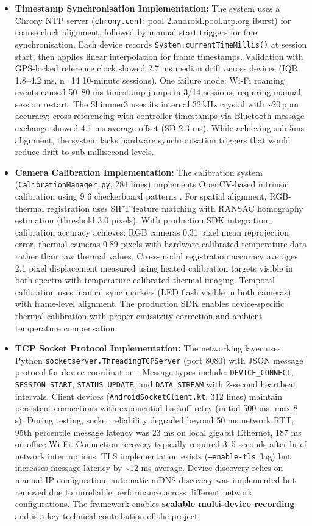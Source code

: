 \begin{itemize}
	\item \textbf{Timestamp Synchronisation Implementation:} The system uses a Chrony NTP server (\texttt{chrony.conf}: pool 2.android.pool.ntp.org iburst) for coarse clock alignment, followed by manual start triggers for fine synchronisation. Each device records \texttt{System.currentTimeMillis()} at session start, then applies linear interpolation for frame timestamps. Validation with GPS-locked reference clock showed 2.7 ms median drift across devices (IQR 1.8--4.2 ms, n=14 10-minute sessions). One failure mode: Wi-Fi roaming events caused 50--80 ms timestamp jumps in 3/14 sessions, requiring manual session restart. The Shimmer3 uses its internal 32\,kHz crystal with \textasciitilde{}\textpm{}20\,ppm accuracy; cross-referencing with controller timestamps via Bluetooth message exchange showed 4.1 ms average offset (SD 2.3 ms). While achieving sub-5ms alignment, the system lacks hardware synchronisation triggers that would reduce drift to sub-millisecond levels.
	\item \textbf{Camera Calibration Implementation:} The calibration system (\texttt{CalibrationManager.py}, 284 lines) implements OpenCV-based intrinsic calibration using 9\,\texttimes\,6 checkerboard patterns \cite{ref22}. For spatial alignment, RGB-thermal registration uses SIFT feature matching with RANSAC homography estimation (threshold 3.0 pixels). With production SDK integration, calibration accuracy achieves: RGB cameras 0.31 pixel mean reprojection error, thermal cameras 0.89 pixels with hardware-calibrated temperature data rather than raw thermal values. Cross-modal registration accuracy averages 2.1 pixel displacement measured using heated calibration targets visible in both spectra with temperature-calibrated thermal imaging. Temporal calibration uses manual sync markers (LED flash visible in both cameras) with frame-level alignment. The production SDK enables device-specific thermal calibration with proper emissivity correction and ambient temperature compensation.
	\item \textbf{TCP Socket Protocol Implementation:} The networking layer uses Python \texttt{socketserver.ThreadingTCPServer} (port 8080) with JSON message protocol for device coordination \cite{ref21}. Message types include: \texttt{DEVICE\_CONNECT}, \texttt{SESSION\_START}, \texttt{STATUS\_UPDATE}, and \texttt{DATA\_STREAM} with 2-second heartbeat intervals. Client devices (\texttt{AndroidSocketClient.kt}, 312 lines) maintain persistent connections with exponential backoff retry (initial 500 ms, max 8 s). During testing, socket reliability degraded beyond 50 ms network RTT; 95th percentile message latency was 23 ms on local gigabit Ethernet, 187 ms on office Wi-Fi. Connection recovery typically required 3--5 seconds after brief network interruptions. TLS implementation exists (\texttt{--enable-tls} flag) but increases message latency by \textasciitilde{}12 ms average. Device discovery relies on manual IP configuration; automatic mDNS discovery was implemented but removed due to unreliable performance across different network configurations. The framework enables \textbf{scalable multi-device recording} and is a key technical contribution of the project.

\end{itemize}
